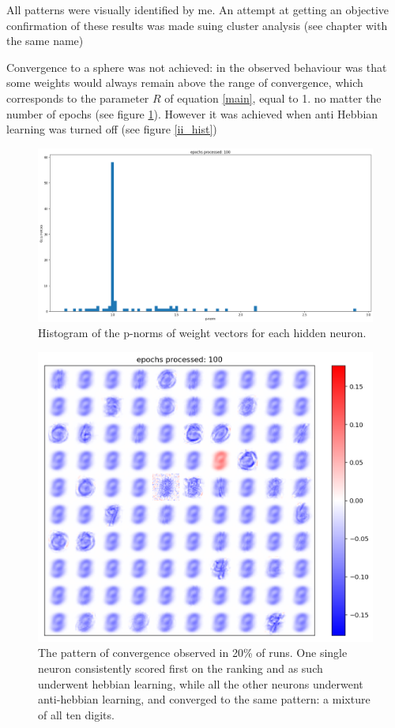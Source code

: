\documentclass[a4paper]{report}
\begin{document}
All patterns were visually identified by me. An attempt at getting an objective confirmation of these results was made suing cluster analysis (see chapter with the same name)

 Convergence to a sphere was not achieved:
in the observed behaviour was that some weights would always remain above the range of convergence, which corresponds to the parameter $R$ of equation \ref{main}, equal to 1. no matter the number of epochs (see figure \ref{uu_hist}).
However it was achieved when anti Hebbian learning was turned off (see figure \ref{ii_hist})
\begin{figure} [H]
    \centering
    \includegraphics [width=12cm ] {o/uu_hist.png}
    \caption{Histogram of the p-norms of weight vectors for each hidden neuron.}
    \label{uu_hist}
\end{figure}

\begin{figure} [H]
    \centering
    \includegraphics [width=12cm ] {h/nove.png}
    \caption{The pattern of convergence observed in 20\% of runs. One single neuron consistently scored first on the ranking and as such underwent hebbian learning, while all the other neurons underwent anti-hebbian learning, and converged to the same pattern: a mixture of all ten digits.}
    \label{nove}
\end{figure}
\end{document}
